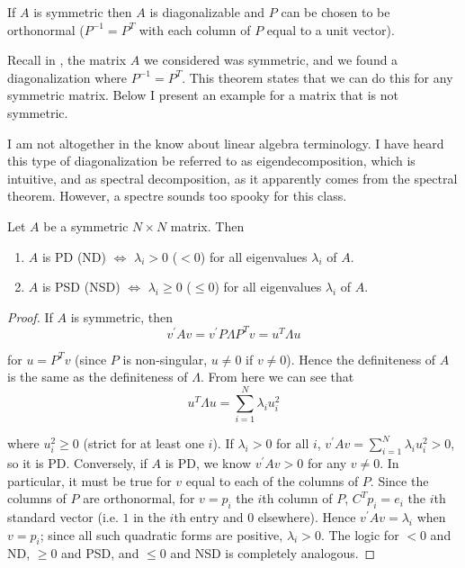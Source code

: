 \documentclass{article}
\begin{document}
\begin{theorem}
  If $A$ is symmetric then $A$ is diagonalizable and $P$ can be chosen to be orthonormal ($P^{-1} = P^T$ with each column of $P$ equal to a unit vector).
\end{theorem}

Recall in , the matrix $A$ we considered was symmetric, and we found a diagonalization where $P^{-1} = P^T$. This theorem states that we can do this for any symmetric matrix. Below I present an example for a matrix that is not symmetric.
\begin{remark}
  I am not altogether in the know about linear algebra terminology. I have heard this type of diagonalization be referred to as eigendecomposition, which is intuitive, and as spectral decomposition, as it apparently comes from the spectral theorem. However, a spectre sounds too spooky for this class.
\end{remark}

\begin{theorem}
  Let $A$ be a symmetric $N \times N$ matrix. Then
  \begin{enumerate}
    \item $A$ is PD (ND) $\iff$ $\lambda_i > 0$ ($< 0$) for all eigenvalues $\lambda_i$ of $A$.
    \item $A$ is PSD (NSD) $\iff$ $\lambda_i \ge 0$ ($\le 0$) for all eigenvalues $\lambda_i$ of $A$.
  \end{enumerate}
\end{theorem}

\begin{proof}
  If $A$ is symmetric, then
  \begin{equation}
    v^\prime A v = v^\prime P \Lambda P^T v = u^T \Lambda u
  \end{equation}

  for $u = P^T v$ (since $P$ is non-singular, $u \ne 0$ if $v \ne 0$). Hence the definiteness of $A$ is the same as the definiteness of $\Lambda$. From here we can see that
  \begin{equation}
    u^T \Lambda u = \sum^{N}_{i = 1} \lambda_i u_i^2
  \end{equation}

  where $u_i^2 \ge 0$ (strict for at least one $i$). If $\lambda_i > 0$ for all $i$, $v^\prime A v = \sum^{N}_{i = 1} \lambda_i u_i^2 > 0$, so it is PD. Conversely, if $A$ is PD, we know $v^\prime A v > 0$ for any $v \ne 0$. In particular, it must be true for $v$ equal to each of the columns of $P$. Since the columns of $P$ are orthonormal, for $v = p_i$ the $i$th column of $P$, $C^T p_i = e_i$ the $i$th standard vector (i.e. $1$ in the $i$th entry and $0$ elsewhere). Hence $v^\prime A v = \lambda_i$ when $v = p_i$; since all such quadratic forms are positive, $\lambda_i > 0$. The logic for $< 0$ and ND, $\ge 0$ and PSD, and $\le 0$ and NSD is completely analogous.
\end{proof}
\end{document}
